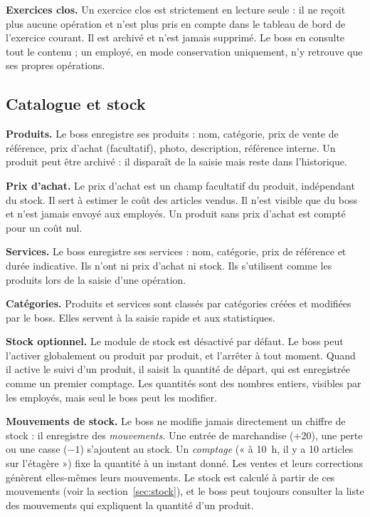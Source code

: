 \documentclass[11pt,a4paper]{article}
\newcommand{\fonc}[2]{\textbf{#1.} #2\par\vspace{0.2em}}
\begin{document}
	\fonc{Exercices clos}{Un exercice clos est strictement en lecture seule : il ne reçoit plus aucune opération et n'est plus pris en compte dans le tableau de bord de l'exercice courant. Il est archivé et n'est jamais supprimé. Le boss en consulte tout le contenu ; un employé, en mode conservation uniquement, n'y retrouve que ses propres opérations.}

	\subsection{Catalogue et stock}

	\fonc{Produits}{Le boss enregistre ses produits : nom, catégorie, prix de vente de référence, prix d'achat (facultatif), photo, description, référence interne. Un produit peut être archivé : il disparaît de la saisie mais reste dans l'historique.}

	\fonc{Prix d'achat}{Le prix d'achat est un champ facultatif du produit, indépendant du stock. Il sert à estimer le coût des articles vendus. Il n'est visible que du boss et n'est jamais envoyé aux employés. Un produit sans prix d'achat est compté pour un coût nul.}

	\fonc{Services}{Le boss enregistre ses services : nom, catégorie, prix de référence et durée indicative. Ils n'ont ni prix d'achat ni stock. Ils s'utilisent comme les produits lors de la saisie d'une opération.}

	\fonc{Catégories}{Produits et services sont classés par catégories créées et modifiées par le boss. Elles servent à la saisie rapide et aux statistiques.}

	\fonc{Stock optionnel}{Le module de stock est désactivé par défaut. Le boss peut l'activer globalement ou produit par produit, et l'arrêter à tout moment. Quand il active le suivi d'un produit, il saisit la quantité de départ, qui est enregistrée comme un premier comptage. Les quantités sont des nombres entiers, visibles par les employés, mais seul le boss peut les modifier.}

	\fonc{Mouvements de stock}{Le boss ne modifie jamais directement un chiffre de stock : il enregistre des \emph{mouvements}. Une entrée de marchandise (+20), une perte ou une casse ($-1$) s'ajoutent au stock. Un \emph{comptage} (« à 10~h, il y a 10 articles sur l'étagère ») fixe la quantité à un instant donné. Les ventes et leurs corrections génèrent elles-mêmes leurs mouvements. Le stock est calculé à partir de ces mouvements (voir la section~\ref{sec:stock}), et le boss peut toujours consulter la liste des mouvements qui expliquent la quantité d'un produit.}
\end{document}
